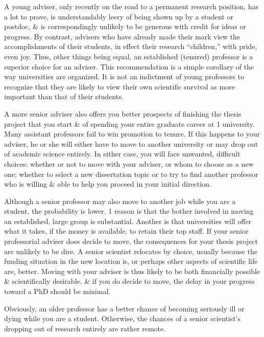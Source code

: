 \documentclass{article}
\begin{document}
\begin{enumerate}
\begin{itemize}
\begin{itemize}
			A young adviser, only recently on the road to a permanent research position, has a lot to prove, is understandably leery of being shown up by a student or postdoc, \& is correspondingly unlikely to be generous with credit for ideas or progress. By contrast, advisers who have already made their mark view the accomplishments of their students, in effect their research ``children,'' with pride, even joy. Thus, other things being equal, an established (tenured) professor is a superior choice for an adviser. This recommendation is a simple corollary of the way universities are organized. It is not an indictment of young professors to recognize that they are likely to view their own scientific survival as more important than that of their students.

			A more senior adviser also offers you better prospects of finishing the thesis project that you start \& of spending your entire graduate career at 1 university. Many assistant professors fail to win promotion to tenure. If this happens to your adviser, he or she will either have to move to another university or may drop out of academic science entirely. In either case, you will face unwanted, difficult choices: whether or not to move with your adviser, or whom to choose as a new one; whether to select a new dissertation topic or to try to find another professor who is willing \& able to help you proceed in your initial direction.

			Although a senior professor may also move to another job while you are a student, the probability is lower. 1 reason is that the bother involved in moving an established, large group is substantial. Another is that universities will offer what it takes, if the money is available, to retain their top staff. If your senior professorial adviser does decide to move, the consequences for your thesis project are unlikely to be dire. A senior scientist relocates by choice, usually because the funding situation in the new location is, or perhaps other aspects of scientific life are, better. Moving with your adviser is thus likely to be both financially possible \& scientifically desirable. \& if you do decide to move, the delay in your progress toward a PhD should be minimal.

			Obviously, an older professor has a better chance of becoming seriously ill or dying while you are a student. Otherwise, the chances of a senior scientist's dropping out of research entirely are rather remote.


\end{itemize}
\end{itemize}
\end{enumerate}
\end{document}

